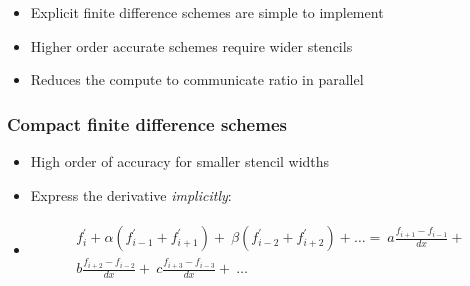 \documentclass[8pt]{beamer}
\begin{document}
\begin{frame}
\begin{itemize}[<+->]
    \item Explicit finite difference schemes are simple to implement
    \item Higher order accurate schemes require wider stencils
    \item Reduces the compute to communicate ratio in parallel
\end{itemize}
\end{frame}

\begin{frame}
\frametitle{Compact finite difference schemes}
\begin{itemize}[<+->]
    \item High order of accuracy for smaller stencil widths
    \item Express the derivative \emph{implicitly}:
    \item [] \begin{align*}
        \begin{split}
            f_i^{\prime} + \alpha(f^{\prime}_{i-1} + f^{\prime}_{i+1}) + \
            \beta(f^{\prime}_{i-2} + f^{\prime}_{i+2}) + \hdots  = \
            a\frac{f_{i+1} - f_{i-1}}{dx} + \\
            b\frac{f_{i+2} - f_{i-2}}{dx} + \
            c\frac{f_{i+3} - f_{i-3}}{dx} + \
            \hdots
        \end{split}
        \end{align*}
\end{itemize}
\end{frame}
\end{document}
